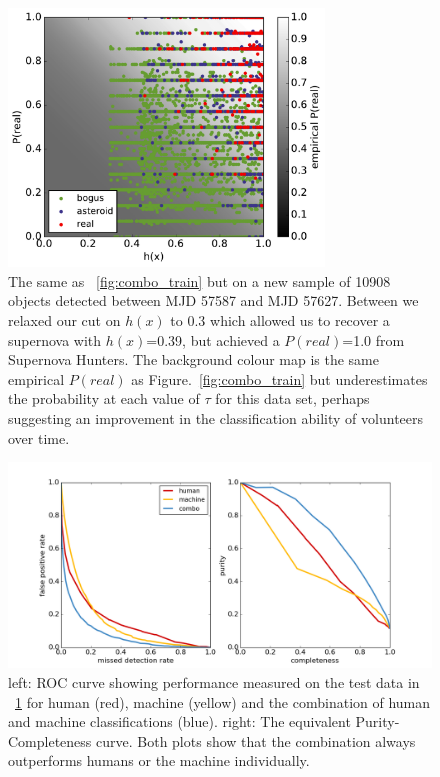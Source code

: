 \documentclass[a4paper,fleqn,usenatbib]{mnras}
\begin{document}
\begin{figure}
   \includegraphics[width=84mm]{figs/human_v_machine_20160725-20160829.pdf}
   \caption{The same as ~\ref{fig:combo_train} but on a new sample of 10908 objects detected between
            MJD 57587 and MJD 57627.  Between we relaxed our cut on $h(x)$ to 0.3 which allowed us to recover a supernova with $h(x)$=0.39, but achieved a $P(real)$=1.0 from Supernova Hunters.  The background colour map is the same empirical $P(real)$ as Figure.~\ref{fig:combo_train} but underestimates the probability at each value of $\tau$ for this data set, perhaps suggesting an improvement in the classification ability of volunteers over time.}
   \label{fig:combo_test} 
\end{figure}

\begin{figure}
   \begin{minipage}{140mm}
   \includegraphics[trim=20mm 0mm 0mm 0mm,clip,width=150mm]{figs/roc.png}
   \caption{left: ROC curve showing performance measured on the test data in ~\ref{fig:combo_test} for human (red), machine (yellow) and
            the combination of human and machine classifications (blue).  right: The equivalent Purity-Completeness curve.  Both
            plots show that the combination always outperforms humans or the machine individually.} 
   \label{fig:roc} 
   \end{minipage}
\end{figure}
\end{document}
